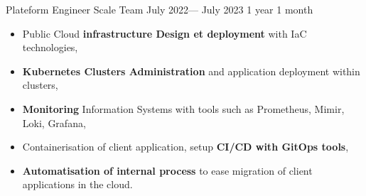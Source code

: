 \jobposition%
{Plateform Engineer}%
{Scale Team}
{July 2022--- July 2023}%
{1 year 1 month}%
{
	\begin{itemize}
		\item Public Cloud \textbf{infrastructure Design et deployment}
		      with IaC technologies,
		\item \textbf{Kubernetes Clusters Administration} and application
		      deployment within clusters,
		\item \textbf{Monitoring} Information Systems with tools such as
		      Prometheus, Mimir, Loki, Grafana,
		\item Containerisation of client application, setup \textbf{CI/CD
			      with GitOps tools},
		\item \textbf{Automatisation of internal process} to ease
		      migration of client applications in the cloud.
	\end{itemize}
}
